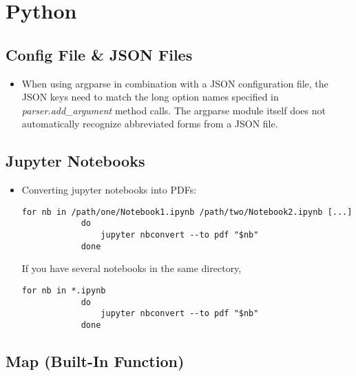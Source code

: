 \documentclass[12pt, a4paper]{article}
\numberwithin{equation}{section}
\theoremstyle{definition}
\theoremstyle{definition}
\begin{document}
	\newpage 
	
	\section{Python}
	
	\subsection{Config File \& JSON Files}
	
	\begin{itemize}
		\item  When using  argparse  in combination with a JSON configuration file, the JSON keys need to match the long option names specified in \textit{parser.add\_argument} method calls. The argparse module itself does not automatically recognize abbreviated forms from a JSON file.
	\end{itemize} 

	\subsection{Jupyter Notebooks}
	\begin{itemize}
		\item Converting jupyter notebooks into PDFs:
		
		\begin{lstlisting}[style=mystylepython, label=alg:notebooks_to_pdf, xleftmargin=\parindent]
			for nb in /path/one/Notebook1.ipynb /path/two/Notebook2.ipynb [...]
			do
				jupyter nbconvert --to pdf "$nb"
			done 
		\end{lstlisting}
	
		If you have several notebooks in the same directory, 
		\begin{lstlisting}[style=mystylepython, label=alg:notebooks_to_pdf__wildcard, xleftmargin=\parindent]
			for nb in *.ipynb
			do
				jupyter nbconvert --to pdf "$nb"
			done 
		\end{lstlisting}
		
	\end{itemize}
	
	\subsection{Map (Built-In Function)}
	
\end{document}
